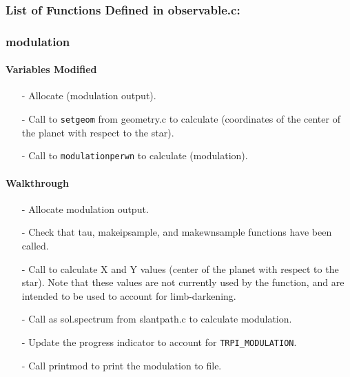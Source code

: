 \documentclass[letterpaper,12pt]{article}
\begin{document}
\subsubsection{List of Functions Defined in observable.c:}
 \newline

 \newline

 \newline

\subsubsection{modulation}
\paragraph{Variables Modified}
\begin{enumerate}[leftmargin=10pt, noitemsep, parsep=0pt, topsep=0ex]
\item[-] Allocate  (modulation output).
\item[-] Call to {\tt setgeom} from geometry.c to calculate  (coordinates of the center of the planet with respect to the star).
\item[-] Call to {\tt modulationperwn} to calculate  (modulation).
\end{enumerate}

\paragraph{Walkthrough}
\begin{enumerate}[leftmargin=10pt, noitemsep, parsep=0pt, topsep=0ex]
\item[-] Allocate modulation output.
\item[-] Check that tau, makeipsample, and makewnsample functions have been called.
\item[-] Call  to calculate X and Y values (center of the planet with respect to the star). Note that these values are not currently used by the function, and are intended to be used to account for limb-darkening.
\item[-] Call  as sol.spectrum from slantpath.c to calculate modulation.
\item[-] Update the progress indicator to account for {\tt TRPI\_MODULATION}.
\item[-] Call printmod to print the modulation to file.
\end{enumerate}
\newpage
\end{document}
